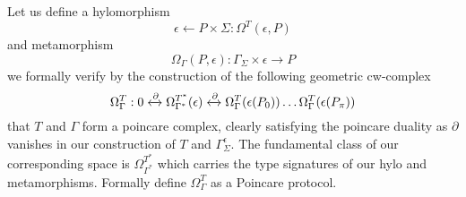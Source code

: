 \documentclass{article}
\begin{document}
Let us define a hylomorphism
\begin{equation} \label{eq1}
\epsilon \leftarrow P \times \Sigma  : \Omega^T(\epsilon, P)
\end{equation} \label{eq1}
and metamorphism
\begin{equation} \label{eq1}
\Omega_\Gamma(P, \epsilon):\Gamma_\Sigma \times \epsilon \rightarrow P  
\end{equation} \label{eq1}
we formally verify by the construction of the following geometric cw-complex
\begin{equation} \label{eq1}
\Omega^T_\Gamma: 0 \xleftrightarrow{\partial} \Omega^{T^*}_{\Gamma^*}(\epsilon) \xleftrightarrow{\partial}  \Omega^T_\Gamma (\epsilon(P_0)) \dots \Omega^T_\Gamma (\epsilon(P_\pi))
\end{equation} \label{eq1}
that $T$ and $\Gamma$ form a poincare complex, clearly satisfying the poincare duality as $\partial$ vanishes in our construction of $T$ and $\Gamma^\epsilon_\Sigma$. The fundamental class of our corresponding space is $\Omega^{T^*}_{\Gamma^*}$ which carries the type signatures of our hylo and metamorphisms. Formally define $\Omega^{T}_{\Gamma}$  as a Poincare protocol.
\end{document}
